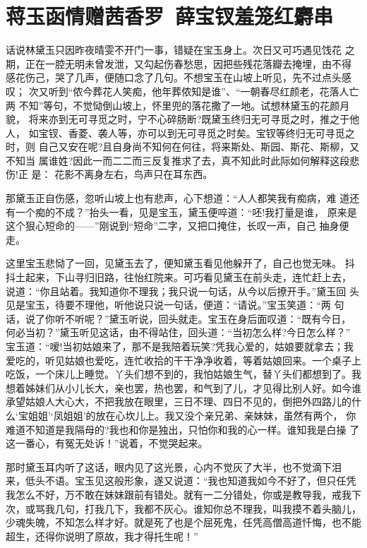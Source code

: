 \chapter{蒋玉函情赠茜香罗~薛宝钗羞笼红麝串}

话说林黛玉只因昨夜晴雯不开门一事，错疑在宝玉身上。次日又可巧遇见饯花
之期，正在一腔无明未曾发泄，又勾起伤春愁思，因把些残花落瓣去掩埋，由不得
感花伤己，哭了几声，便随口念了几句。不想宝玉在山坡上听见，先不过点头感叹；
次又听到“侬今葬花人笑痴，他年葬侬知是谁”、“一朝春尽红颜老，花落人亡两
不知”等句，不觉恸倒山坡上，怀里兜的落花撒了一地。试想林黛玉的花颜月貌，
将来亦到无可寻觅之时，宁不心碎肠断?既黛玉终归无可寻觅之时，推之于他人，
如宝钗、香菱、袭人等，亦可以到无可寻觅之时矣。宝钗等终归无可寻觅之时，则
自己又安在呢?且自身尚不知何在何往，将来斯处、斯园、斯花、斯柳，又不知当
属谁姓?因此一而二二而三反复推求了去，真不知此时此际如何解释这段悲伤!正
是：
花影不离身左右，鸟声只在耳东西。

那黛玉正自伤感，忽听山坡上也有悲声，心下想道：“人人都笑我有痴病，难
道还有一个痴的不成？”抬头一看，见是宝玉，黛玉便啐道：“呸!我打量是谁，
原来是这个狠心短命的——”刚说到“短命”二字，又把口掩住，长叹一声，自己
抽身便走。

这里宝玉悲恸了一回，见黛玉去了，便知黛玉看见他躲开了，自己也觉无味。
抖抖土起来，下山寻归旧路，往怡红院来。可巧看见黛玉在前头走，连忙赶上去，
说道：“你且站着。我知道你不理我；我只说一句话，从今以后撩开手。”黛玉回
头见是宝玉，待要不理他，听他说只说一句话，便道：“请说。”宝玉笑道：“两
句话，说了你听不听呢？”黛玉听说，回头就走。宝玉在身后面叹道：“既有今日，
何必当初？”黛玉听见这话，由不得站住，回头道：“当初怎么样?今日怎么样？”
宝玉道：“嗳!当初姑娘来了，那不是我陪着玩笑?凭我心爱的，姑娘要就拿去；我
爱吃的，听见姑娘也爱吃，连忙收拾的干干净净收着，等着姑娘回来。一个桌子上
吃饭，一个床儿上睡觉。丫头们想不到的，我怕姑娘生气，替丫头们都想到了。我
想着姊妹们从小儿长大，亲也罢，热也罢，和气到了儿，才见得比别人好。如今谁
承望姑娘人大心大，不把我放在眼里，三日不理、四日不见的，倒把外四路儿的什
么‘宝姐姐’‘凤姐姐’的放在心坎儿上。我又没个亲兄弟、亲妹妹，虽然有两个，
你难道不知道是我隔母的?我也和你是独出，只怕你和我的心一样。谁知我是白操
了这一番心，有冤无处诉！”说着，不觉哭起来。

那时黛玉耳内听了这话，眼内见了这光景，心内不觉灰了大半，也不觉滴下泪
来，低头不语。宝玉见这般形象，遂又说道：“我也知道我如今不好了，但只任凭
我怎么不好，万不敢在妹妹跟前有错处。就有一二分错处，你或是教导我，戒我下
次，或骂我几句，打我几下，我都不灰心。谁知你总不理我，叫我摸不着头脑儿，
少魂失魄，不知怎么样才好。就是死了也是个屈死鬼，任凭高僧高道忏悔，也不能
超生，还得你说明了原故，我才得托生呢！”

